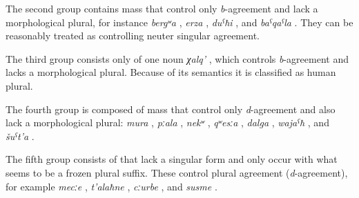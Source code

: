 The second group contains mass  that control only \textit{b}-agreement and lack a morphological plural, for instance \textit{bergʷa} , \textit{erza} , \textit{duˁħi} , and \textit{baˁqaˁla} . They can be reasonably treated as controlling neuter singular agreement.

The third group consists only of one noun \textit{χalq'} , which controls \textit{b}-agreement and lacks a morphological plural. Because of its semantics it is classified as human plural.  

The fourth group is composed of mass  that control only \textit{d}-agreement and also lack a morphological plural: \textit{mura} , \textit{pːala} , \textit{nekʷ} , \textit{qʷesːa} , \textit{dalga} , \textit{wajaˁħ} , and \textit{šuˁt'a} .

The fifth group consists of  that lack a singular form and only occur with what seems to be a frozen plural suffix. These  control plural agreement (\textit{d}-agreement), for example \textit{mecːe} , \textit{t'alaħne} , \textit{cːurbe} , and \textit{susme} .

